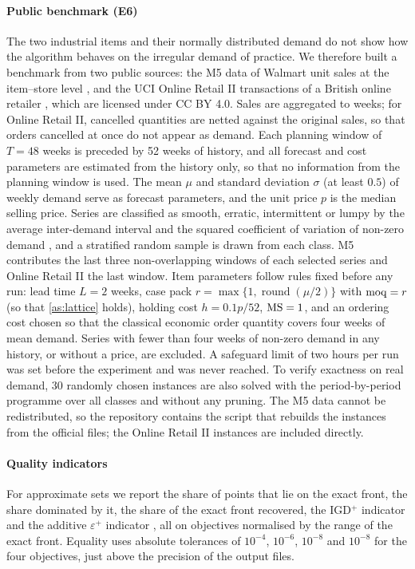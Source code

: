\documentclass[preprint,12pt,authoryear]{elsarticle}
\begin{document}
\paragraph{Public benchmark (E6)}
The two industrial items and their normally distributed demand do not show how the
algorithm behaves on the irregular demand of practice. We therefore built a benchmark from
two public sources: the M5 data of Walmart unit sales at the item--store level
\citep{Makridakis2022M5}, and the UCI Online Retail II transactions of a British online
retailer \citep{Chen2012Retail}, which are licensed under CC BY 4.0. Sales are aggregated to
weeks; for Online Retail II, cancelled quantities are netted against the original sales,
so that orders cancelled at once do not appear as demand. Each planning window of $T=48$ weeks is preceded by 52 weeks of history, and all
forecast and cost parameters are estimated from the history only, so that no information
from the planning window is used. The mean $\mu$ and standard deviation $\sigma$ (at least
$0.5$) of weekly demand serve as forecast parameters, and the unit price $p$ is the median
selling price. Series are classified as smooth, erratic, intermittent or lumpy by the
average inter-demand interval and the squared coefficient of variation of non-zero demand
\citep{SyntetosBoylan2005}, and a stratified random sample is drawn from each class. M5
contributes the last three non-overlapping windows of each selected series and Online
Retail II the last window. Item parameters follow rules fixed before any run: lead time
$L=2$ weeks, case pack $r=\max\{1,\operatorname{round}(\mu/2)\}$ with $\mathrm{moq}=r$ (so that
\cref{as:lattice} holds), holding cost $h=0.1p/52$, $\mathrm{MS}=1$, and an ordering cost chosen so
that the classical economic order quantity covers four weeks of mean demand. Series with
fewer than four weeks of non-zero demand in any history, or without a price, are excluded.
A safeguard limit of two hours per run was set before the experiment and was never
reached. To verify exactness on real demand, 30 randomly chosen instances are also solved
with the period-by-period programme over all classes and without any pruning. The M5 data cannot be redistributed, so the repository contains the
script that rebuilds the instances from the official files; the Online Retail II instances
are included directly.

\paragraph{Quality indicators}
For approximate sets we report the share of points that lie on the exact front, the
share dominated by it, the share of the exact front recovered, the IGD$^+$ indicator
\citep{Ishibuchi2015} and the additive $\varepsilon^+$ indicator \citep{Zitzler2003}, all
on objectives normalised by the range of the exact front. Equality uses absolute
tolerances of $10^{-4}$, $10^{-6}$, $10^{-8}$ and $10^{-8}$ for the four objectives, just
above the precision of the output files.
\end{document}
